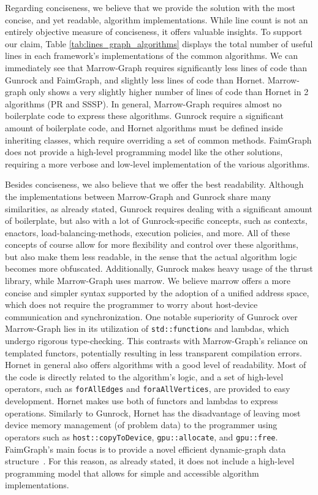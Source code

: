 Regarding conciseness, we believe that we provide the solution with the most concise, and yet readable, algorithm implementations. While line count is not an entirely objective measure of conciseness, it offers valuable insights. To support our claim, Table \ref{tab:lines_graph_algorithms} displays the total number of useful lines in each framework's implementations of the common algorithms. We can immediately see that Marrow-Graph requires significantly less lines of code than Gunrock and FaimGraph, and slightly less lines of code than Hornet. Marrow-graph only shows a very slightly higher number of lines of code than Hornet in 2 algorithms (\gls{PR} and \gls{SSSP}). In general, Marrow-Graph requires almost no boilerplate code to express these algorithms. Gunrock require a significant amount of boilerplate code, and Hornet algorithms must be defined inside inheriting classes, which require overriding a set of common methods. FaimGraph does not provide a high-level programming model like the other solutions, requiring a more verbose and low-level implementation of the various algorithms.

Besides conciseness, we also believe that we offer the best readability. Although the implementations between Marrow-Graph and Gunrock share many similarities, as already stated, Gunrock requires dealing with a significant amount of boilerplate, but also with a lot of Gunrock-specific concepts, such as contexts, enactors, load-balancing-methods, execution policies, and more. All of these concepts of course allow for more flexibility and control over these algorithms, but also make them less readable, in the sense that the actual algorithm logic becomes more obfuscated. Additionally, Gunrock makes heavy usage of the thrust library, while Marrow-Graph uses marrow. We believe marrow offers a more concise and simpler syntax supported by the adoption of a unified address space, which does not require the programmer to worry about host-device communication and synchronization. One notable superiority of Gunrock over Marrow-Graph lies in its utilization of \texttt{std::function}s and lambdas, which undergo rigorous type-checking. This contrasts with Marrow-Graph's reliance on templated functors, potentially resulting in less transparent compilation errors. Hornet in general also offers algorithms with a good level of readability. Most of the code is directly related to the algorithm's logic, and a set of high-level operators, such as \texttt{forAllEdges} and \texttt{foraAllVertices}, are provided to easy development. Hornet makes use both of functors and lambdas to express operations. Similarly to Gunrock, Hornet has the disadvantage of leaving most device memory management (of problem data) to the programmer using operators such as \texttt{host::copyToDevice}, \texttt{gpu::allocate}, and \texttt{gpu::free}. FaimGraph's main focus is to provide a novel efficient dynamic-graph data structure~\cite{paper:faimgraph}. For this reason, as already stated, it does not include a high-level programming model that allows for simple and accessible algorithm implementations.

